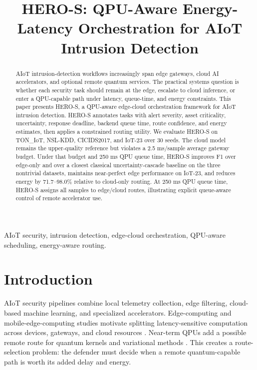 \documentclass[conference]{IEEEtran}
\title{HERO-S: QPU-Aware Energy-Latency Orchestration for AIoT Intrusion Detection}
\author{\IEEEauthorblockN{Author Name(s) Omitted for Review}\IEEEauthorblockA{Institution Omitted for Review}}
\begin{document}
\maketitle

\begin{abstract}
AIoT intrusion-detection workflows increasingly span edge gateways, cloud AI accelerators, and optional remote quantum services. The practical systems question is whether each security task should remain at the edge, escalate to cloud inference, or enter a QPU-capable path under latency, queue-time, and energy constraints. This paper presents HERO-S, a QPU-aware edge-cloud orchestration framework for AIoT intrusion detection. HERO-S annotates tasks with alert severity, asset criticality, uncertainty, response deadline, backend queue time, route confidence, and energy estimates, then applies a constrained routing utility. We evaluate HERO-S on TON\_IoT, NSL-KDD, CICIDS2017, and IoT-23 over 30 seeds. The cloud model remains the upper-quality reference but violates a 2.5 ms/sample average gateway budget. Under that budget and 250 ms QPU queue time, HERO-S improves F1 over edge-only and over a closest classical uncertainty-cascade baseline on the three nontrivial datasets, maintains near-perfect edge performance on IoT-23, and reduces energy by 71.7--98.0\% relative to cloud-only routing. At 250 ms QPU queue time, HERO-S assigns all samples to edge/cloud routes, illustrating explicit queue-aware control of remote accelerator use.
\end{abstract}

\begin{IEEEkeywords}
AIoT security, intrusion detection, edge-cloud orchestration, QPU-aware scheduling, energy-aware routing.
\end{IEEEkeywords}

\section{Introduction}
AIoT security pipelines combine local telemetry collection, edge filtering, cloud-based machine learning, and specialized accelerators. Edge-computing and mobile-edge-computing studies motivate splitting latency-sensitive computation across devices, gateways, and cloud resources \cite{shi2016edge,mach2017mec}. Near-term QPUs add a possible remote route for quantum kernels and variational methods \cite{preskill2018nisq,havlicek2019supervised,schuld2019qml,cerezo2021vqa}. This creates a route-selection problem: the defender must decide when a remote quantum-capable path is worth its added delay and energy.
\end{document}
